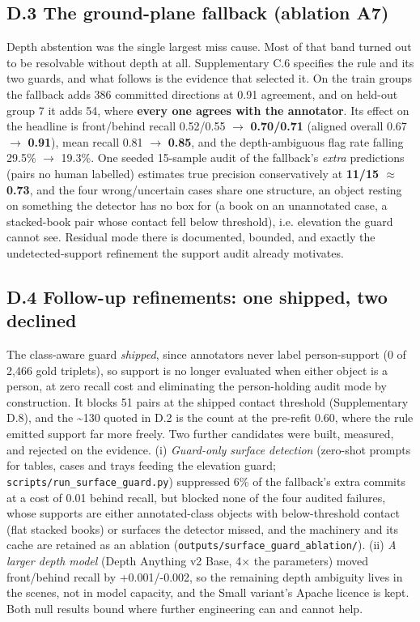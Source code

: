 \subsection{D.3 The ground-plane fallback (ablation A7)}

Depth abstention was the single largest miss cause. Most of that band turned out to be resolvable without depth at all. Supplementary C.6 specifies the rule and its two guards, and what follows is the evidence that selected it. On the train groups the fallback adds 386 committed directions at 0.91 agreement, and on held-out group 7 it adds 54, where \textbf{every one agrees with the annotator}. Its effect on the headline is front/behind recall 0.52/0.55 $\rightarrow$ \textbf{0.70/0.71} (aligned overall 0.67 $\rightarrow$ \textbf{0.91}), mean recall 0.81 $\rightarrow$ \textbf{0.85}, and the depth-ambiguous flag rate falling 29.5\% $\rightarrow$ 19.3\%. One seeded 15-sample audit of the fallback's \textit{extra} predictions (pairs no human labelled) estimates true precision conservatively at \textbf{11/15 $\approx$ 0.73}, and the four wrong/uncertain cases share one structure, an object resting on something the detector has no box for (a book on an unannotated case, a stacked-book pair whose contact fell below threshold), i.e. elevation the guard cannot see. Residual mode there is documented, bounded, and exactly the undetected-support refinement the support audit already motivates.

\subsection{D.4 Follow-up refinements: one shipped, two declined}

The class-aware guard \textit{shipped}, since annotators never label person-support (0 of 2,466 gold triplets), so support is no longer evaluated when either object is a person, at zero recall cost and eliminating the person-holding audit mode by construction. It blocks 51 pairs at the shipped contact threshold (Supplementary D.8), and the \textasciitilde{}130 quoted in D.2 is the count at the pre-refit 0.60, where the rule emitted support far more freely. Two further candidates were built, measured, and rejected on the evidence. (i) \textit{Guard-only surface detection} (zero-shot prompts for tables, cases and trays feeding the elevation guard; \texttt{scripts/run\_\allowbreak{}surface\_\allowbreak{}guard.py}) suppressed 6\% of the fallback's extra commits at a cost of 0.01 behind recall, but blocked none of the four audited failures, whose supports are either annotated-class objects with below-threshold contact (flat stacked books) or surfaces the detector missed, and the machinery and its cache are retained as an ablation (\texttt{outputs/surface\_\allowbreak{}guard\_\allowbreak{}ablation/}). (ii) \textit{A larger depth model} (Depth Anything v2 Base, 4$\times$ the parameters) moved front/behind recall by +0.001/-0.002, so the remaining depth ambiguity lives in the scenes, not in model capacity, and the Small variant's Apache licence is kept. Both null results bound where further engineering can and cannot help.

